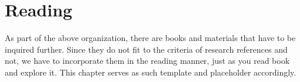 \chapter{Reading}
As part of the above organization, there are books and materials that have to be inquired further. Since they do not fit to the criteria of research references and not, we have to incorporate them in the reading manner, just as you read book and explore it. This chapter serves as such template and placeholder accordingly. 